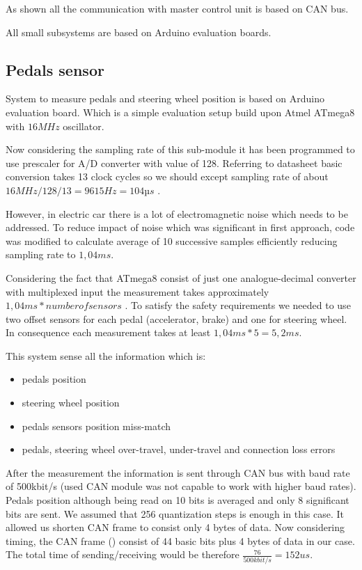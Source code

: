 
As shown all the communication with master control unit is based on CAN bus. 






All small subsystems are based on Arduino evaluation boards.


\subsection{Pedals sensor}
System to measure pedals and steering wheel position is based on Arduino evaluation board. Which is a simple evaluation setup build upon Atmel ATmega8 with $16MHz$ oscillator.

Now considering the sampling rate of this sub-module it has been programmed to use prescaler for A/D converter with value of 128. Referring to datasheet basic conversion takes 13 clock cycles so we should except sampling rate of about $16MHz/128/13 = 9615Hz = 104µs$ \cite{Atmega8}.

However, in electric car there is a lot of electromagnetic noise which needs to be addressed. To reduce impact of noise which was significant in first approach, code was modified to calculate average of 10 successive samples efficiently reducing sampling rate to $1,04ms$.

Considering the fact that ATmega8 consist of just one analogue-decimal converter with multiplexed input the measurement takes approximately $1,04ms * number of sensors$ \cite{Atmega8}.
To satisfy the safety requirements we needed to use two offset sensors for each pedal (accelerator, brake) and one for steering wheel. In consequence each measurement takes at least $1,04ms * 5 = 5,2ms$.

This system sense all the information which is:
\begin{itemize}
    \item pedals position
    \item steering wheel position
    \item pedals sensors position miss-match
    \item pedals, steering wheel over-travel, under-travel and connection loss errors
\end{itemize}

After the measurement the information is sent through CAN bus with baud rate of 500kbit/s (used CAN module was not capable to work with higher baud rates). Pedals position although being read on 10 bits is averaged and only 8 significant bits are sent. We assumed that 256 quantization steps is enough in this case. It allowed us shorten CAN frame to consist only 4 bytes of data.
Now considering timing, the CAN frame () consist of 44 basic bits plus 4 bytes of data in our case. The total time of sending/receiving would be therefore $\frac{76}{500kbit/s} = 152us$.

